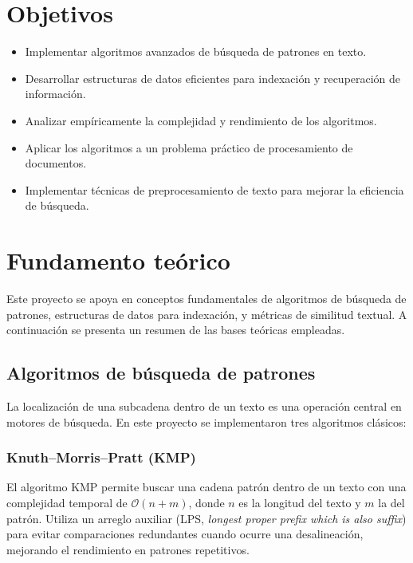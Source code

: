 \documentclass[9pt,letterpaper,onecolumn]{rho-class/rho}
\begin{document}
\section{Objetivos}
\begin{itemize}
    \item Implementar algoritmos avanzados de búsqueda de patrones en texto.
    \item Desarrollar estructuras de datos eficientes para indexación y recuperación de información.
    \item Analizar empíricamente la complejidad y rendimiento de los algoritmos.
    \item Aplicar los algoritmos a un problema práctico de procesamiento de documentos.
    \item Implementar técnicas de preprocesamiento de texto para mejorar la eficiencia de búsqueda.
\end{itemize}

\section{Fundamento teórico}
\label{sec:fundamentoteorico}

Este proyecto se apoya en conceptos fundamentales de algoritmos de búsqueda de patrones, estructuras de datos para indexación, y métricas de similitud textual. A continuación se presenta un resumen de las bases teóricas empleadas.

\subsection{Algoritmos de búsqueda de patrones}

La localización de una subcadena dentro de un texto es una operación central en motores de búsqueda. En este proyecto se implementaron tres algoritmos clásicos:

\subsubsection*{Knuth–Morris–Pratt (KMP)}

El algoritmo KMP permite buscar una cadena patrón dentro de un texto con una complejidad temporal de $\mathcal{O}(n + m)$, donde $n$ es la longitud del texto y $m$ la del patrón. Utiliza un arreglo auxiliar (LPS, \textit{longest proper prefix which is also suffix}) para evitar comparaciones redundantes cuando ocurre una desalineación, mejorando el rendimiento en patrones repetitivos.
\end{document}
